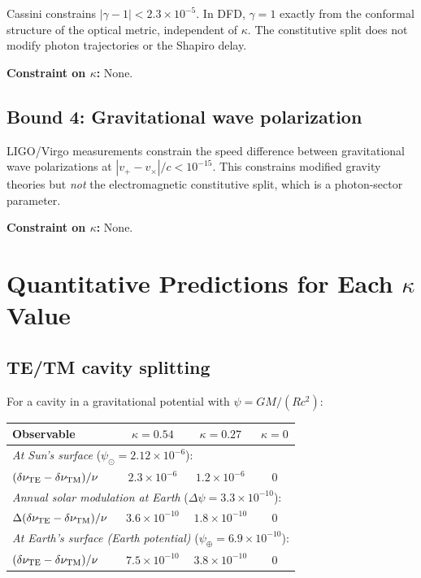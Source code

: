 \documentclass[11pt,a4paper]{article}
\theoremstyle{definition}
\begin{document}
Cassini constrains $|\gamma - 1| < 2.3 \times 10^{-5}$.
In DFD, $\gamma = 1$ exactly from the conformal structure of
the optical metric, independent of $\kappa$.  The constitutive
split does not modify photon trajectories or the Shapiro delay.

\textbf{Constraint on $\kappa$:} None.

\subsection{Bound 4: Gravitational wave polarization}
\label{sec:gw}

LIGO/Virgo measurements constrain the speed difference between
gravitational wave polarizations at
$|v_+ - v_\times|/c < 10^{-15}$.  This constrains modified
gravity theories but \emph{not} the electromagnetic constitutive
split, which is a photon-sector parameter.

\textbf{Constraint on $\kappa$:} None.


\section{Quantitative Predictions for Each $\kappa$ Value}
\label{sec:predictions}

\subsection{TE/TM cavity splitting}

For a cavity in a gravitational potential with
$\psi = GM/(Rc^2)$:

\begin{center}
\begin{tabular}{lccc}
\toprule
\textbf{Observable} & $\kappa = 0.54$ & $\kappa = 0.27$ &
  $\kappa = 0$ \\
\midrule
\multicolumn{4}{l}{\textit{At Sun's surface}
  ($\psi_\odot = 2.12 \times 10^{-6}$):} \\
$(\delta\nu_{\rm TE} - \delta\nu_{\rm TM})/\nu$ &
  $2.3 \times 10^{-6}$ & $1.2 \times 10^{-6}$ & $0$ \\[4pt]
\multicolumn{4}{l}{\textit{Annual solar modulation at Earth}
  ($\Delta\psi = 3.3 \times 10^{-10}$):} \\
$\Delta(\delta\nu_{\rm TE} - \delta\nu_{\rm TM})/\nu$ &
  $3.6 \times 10^{-10}$ & $1.8 \times 10^{-10}$ & $0$ \\[4pt]
\multicolumn{4}{l}{\textit{At Earth's surface (Earth potential)}
  ($\psi_\oplus = 6.9 \times 10^{-10}$):} \\
$(\delta\nu_{\rm TE} - \delta\nu_{\rm TM})/\nu$ &
  $7.5 \times 10^{-10}$ & $3.8 \times 10^{-10}$ & $0$ \\
\bottomrule
\end{tabular}
\end{center}
\end{document}
